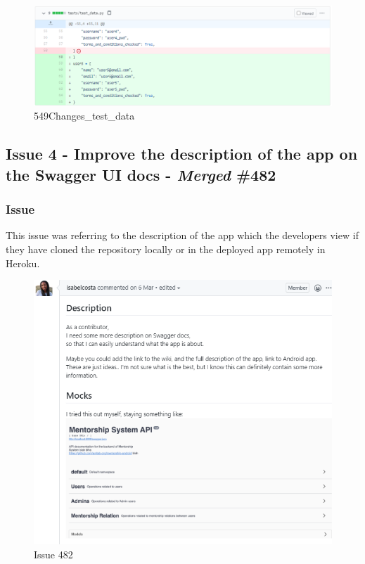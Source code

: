 \documentclass{article}
\begin{document}
\begin{figure}[tph!]
\centerline{\includegraphics[totalheight=10cm, width=18cm]{549Changes_test_data.png}}
    \caption{549Changes\_test\_data}
    \label{fig:verticalcell}
\end{figure}
\vfill
\clearpage

\subsection{Issue 4 - Improve the description of the app on the Swagger UI docs - \emph{Merged} \#482}
\subsubsection{Issue}
\hspace{0.5cm}This issue was referring to the description of the app which the developers view if they have cloned the repository locally or in the deployed app remotely in Heroku.
\begin{figure}[tph!]
\centerline{\includegraphics[totalheight=12cm, width=14cm]{issue482.png}}
    \caption{Issue 482}
    \label{fig:verticalcell}
\end{figure}
\end{document}
